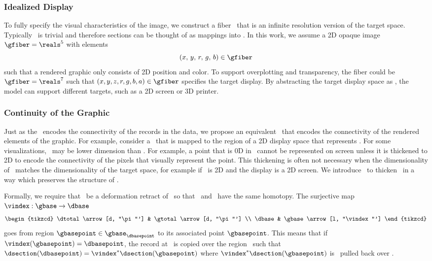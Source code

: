 \documentclass[../main.tex]{subfiles}
\begin{document}
\subsubsection{Idealized Display \gfiber}
\label{sec:graphic_fiber}
To fully specify the visual characteristics of the image, we construct a fiber \gfiber\ that is an infinite resolution version of the target space. Typically \gtotal\ is trivial and therefore sections can be thought of as mappings into \gfiber. In this work, we assume a 2D opaque image $\gfiber=\reals^5$ with elements 
\begin{equation}
(x,\, y,\, r,\, g,\, b) \in \gfiber
\end{equation}
such that a rendered graphic only consists of 2D position and color. To support overplotting and transparency, the fiber could be $\gfiber=\reals^{7}$ such that $(x, y, z, r, g, b, a) \in \gfiber$ specifies the target display. By abstracting the target display space as \gfiber, the model can support different targets, such as a 2D screen or 3D printer. 

\subsubsection{Continuity of the Graphic \gbase} 
\label{sec:graphic_base}
Just as the \dbase\ encodes the connectivity of the records in the data, we propose an equivalent \gbase\ that encodes the connectivity of the rendered elements of the graphic. For example, consider a \gbase\ that is mapped to the region of a 2D display space that represents \dbase. For some visualizations, \dbase\ may be lower dimension than \gbase. For example, a point that is 0D in \dbase\ cannot be represented on screen unless it is thickened to 2D to encode the connectivity of the pixels that visually represent the point. This thickening is often not necessary when the dimensionality of \dbase\ matches the dimensionality of the target space, for example if \dbase\ is 2D and the display is a 2D screen. We introduce \gbase\ to thicken \dbase\ in a way which preserves the structure of \dbase. 

Formally, we require that \dbase\ be a deformation retract\cite{RetractionTopology2020} of \gbase\ so that \dbase\ and \gbase\ have the same homotopy. The surjective map $\vindex: \gbase \rightarrow \dbase$ 
\begin{equation}
    \begin{tikzcd}
        \dtotal \arrow[d, "\pi"'] & \gtotal \arrow[d, "\pi"'] \\
        \dbase                   & \gbase \arrow[l, "\vindex"']
    \end{tikzcd}
\end{equation}
goes from region $\gbasepoint \in \gbase_{\dbasepoint}$ to its associated point $\gbasepoint$. This means that if $\vindex(\gbasepoint) = \dbasepoint$, the record at \dbasepoint\ is copied over the region \gbasepoint\ such that $\dsection(\dbasepoint)=\vindex^*\dsection(\gbasepoint)$ where $\vindex^*\dsection(\gbasepoint)$  is \dsection\ pulled back over \gbase. 
\end{document}
